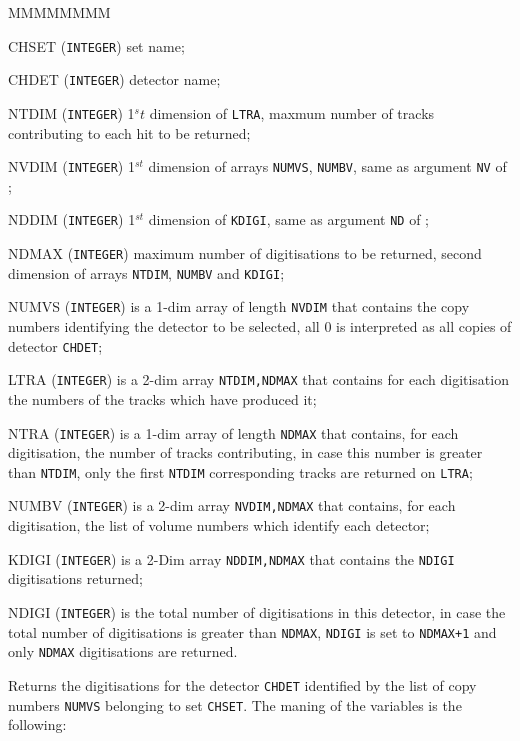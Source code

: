 \begin{DLtt}{MMMMMMMM}
\item[CHSET] ({\tt INTEGER}) set name;
\item[CHDET] ({\tt INTEGER}) detector name;
\item[NTDIM] ({\tt INTEGER}) 1$^st$ dimension of {\tt LTRA}, maxmum number of 
tracks contributing to each hit to be returned;
\item[NVDIM] ({\tt INTEGER}) 1$^{st}$ dimension of arrays {\tt NUMVS}, 
{\tt NUMBV}, same as argument {\tt NV} of ;
\item[NDDIM] ({\tt INTEGER}) 1$^{st}$ dimension of {\tt KDIGI}, same
as argument {\tt ND} of ;
\item[NDMAX] ({\tt INTEGER}) maximum number of digitisations to be returned,
second dimension of arrays {\tt NTDIM}, {\tt NUMBV} and {\tt KDIGI};
\item[NUMVS] ({\tt INTEGER}) is a 1-dim array of length {\tt NVDIM}
that contains the copy numbers identifying the detector to be selected, all 
0 is interpreted as all copies of detector {\tt CHDET};
\item[LTRA] ({\tt INTEGER}) is a 2-dim array {\tt NTDIM,NDMAX} that contains
for each digitisation the numbers of the tracks which have produced it;
\item[NTRA] ({\tt INTEGER}) is a 1-dim array of length {\tt NDMAX} that contains,
for each digitisation, the number of tracks contributing,
in case this number is greater than {\tt NTDIM}, only the first
{\tt NTDIM} corresponding tracks are returned on {\tt LTRA};
\item[NUMBV] ({\tt INTEGER}) is a 2-dim array {\tt NVDIM,NDMAX} that contains,
for each digitisation, the
list of volume numbers which identify each detector;
\item[KDIGI] ({\tt INTEGER}) is a 2-Dim array {\tt NDDIM,NDMAX} that contains 
the {\tt NDIGI} digitisations returned;
\item[NDIGI] ({\tt INTEGER}) is the total number of digitisations in this 
detector,
in case the total number of digitisations is greater than {\tt NDMAX},
{\tt NDIGI} is set to {\tt NDMAX+1} and only {\tt NDMAX} digitisations are
returned.
\end{DLtt}
Returns the digitisations for the detector {\tt CHDET} identified by the list 
of copy numbers {\tt NUMVS} belonging to set {\tt CHSET}. The maning of
the variables is the following:

